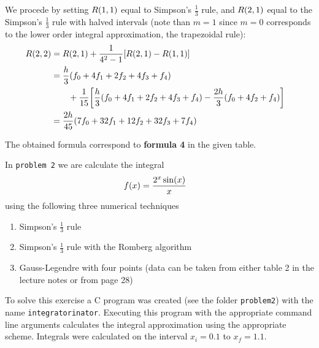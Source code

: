 \documentclass[12pt]{article}
\newenvironment{ex}[2][Exercise]{\begin{trivlist}
\item[\hskip \labelsep {\bfseries #1}\hskip \labelsep {\bfseries #2.}]}{\end{trivlist}}
\newenvironment{sol}[1][Solution]{\begin{trivlist}
\item[\hskip \labelsep {\bfseries #1:}]}{\end{trivlist}}
\DeclarePairedDelimiter\rb{(}{)}
\DeclarePairedDelimiter\sqrb{[}{]}
\begin{document}
We procede by setting \(R\rb*{1,1} \) equal to Simpson's \(\frac{1}{3} \) rule, and \(R \rb*{2,1}\) equal to the Simpson's \(\frac{1}{3}\) rule with halved intervals (note than \(m = 1\) since \(m = 0 \) corresponds to the lower order integral approximation, the trapezoidal rule):
\begin{align*}
    R \rb*{2,2} & =  R \rb*{2,1} + \frac{1}{4^{2} -1 } \sqrb*{ R \rb*{2, 1} - R \rb*{1,1}} &\\
    & = \frac{h}{3} \rb*{ f_{0} + 4 f_{1} + 2 f_{2} + 4 f_{3} + f_{4}}  &\\
    & \hspace{20 pt}+ \frac{1}{15} \sqrb*{ \frac{h}{3} \rb*{ f_{0} + 4f_{1} + 2 f_{2} + 4 f_{3} + f_{4}}
- \frac{2 h}{3} \rb*{f_{0} + 4 f_{2} + f_{4}}} &\\
& = \frac{2 h}{45} \rb*{ 7 f_{0} + 32 f_{1} + 12 f_{2} + 32 f_{3} + 7 f_{4}} &\\
\end{align*}

The obtained formula correspond to \textbf{formula 4} in the given table. 

\newpage

\begin{ex}
    2
\end{ex}

In \texttt{problem 2} we are calculate the integral
\begin{align*}
    f \rb*{x} & =  \frac{2^{x} \sin \rb*{x} }{x}
\end{align*}
using the following three numerical techniques
\begin{enumerate}[label=(\alph*)]
    \item Simpson's \(\frac{1}{3}\) rule
    \item Simpson's \(\frac{1}{3}\) rule with the Romberg algorithm
    \item Gauss-Legendre with four points (data can be taken from either table 2 in the lecture notes or from page 28)
\end{enumerate}

\begin{sol}  \end{sol}

To solve this exercise a C program was created (see the folder \texttt{problem2}) with the name \texttt{integratorinator}. Executing this program with the appropriate command line arguments calculates the integral approximation using the appropriate scheme. Integrals were calculated on the interval \(x_{i} = 0.1\) to \(x_{f} = 1.1\).
\end{document}
